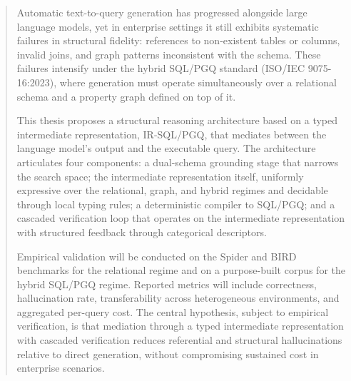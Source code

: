\begin{abstract}
Automatic text-to-query generation has progressed alongside large language models, yet in enterprise settings it still exhibits systematic failures in structural fidelity: references to non-existent tables or columns, invalid joins, and graph patterns inconsistent with the schema. These failures intensify under the hybrid \ac{SQL}/\ac{PGQ} standard (ISO/IEC 9075-16:2023), where generation must operate simultaneously over a relational schema and a property graph defined on top of it.

This thesis proposes a structural reasoning architecture based on a typed intermediate representation, IR-SQL/PGQ, that mediates between the language model's output and the executable query. The architecture articulates four components: a dual-schema grounding stage that narrows the search space; the intermediate representation itself, uniformly expressive over the relational, graph, and hybrid regimes and decidable through local typing rules; a deterministic compiler to \ac{SQL}/\ac{PGQ}; and a cascaded verification loop that operates on the intermediate representation with structured feedback through categorical descriptors.

Empirical validation will be conducted on the Spider and BIRD benchmarks for the relational regime and on a purpose-built corpus for the hybrid \ac{SQL}/\ac{PGQ} regime. Reported metrics will include correctness, hallucination rate, transferability across heterogeneous environments, and aggregated per-query cost. The central hypothesis, subject to empirical verification, is that mediation through a typed intermediate representation with cascaded verification reduces referential and structural hallucinations relative to direct generation, without compromising sustained cost in enterprise scenarios.
\end{abstract}
